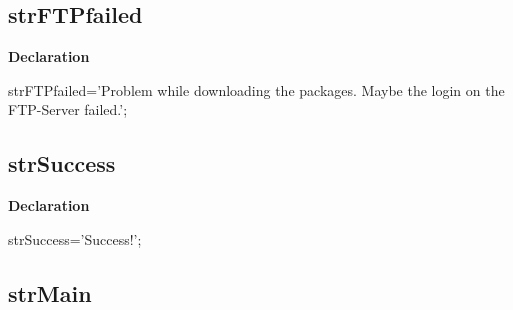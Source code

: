 \documentclass{report}
\newif\ifpdf
\begin{document}
\subsection*{strFTPfailed}
\fi
\label{trstrings-strFTPfailed}
\begin{list}{}{
\setlength{\itemindent}{0cm}
\setlength{\listparindent}{0cm}
\setlength{\leftmargin}{\evensidemargin}
\addtolength{\leftmargin}{\tmplength}
\settowidth{\labelsep}{X}
\addtolength{\leftmargin}{\labelsep}
\setlength{\labelwidth}{\tmplength}
}
\item[\textbf{Declaration}\hfill]
\ifpdf
\begin{flushleft}
\fi
\begin{ttfamily}
strFTPfailed='Problem while downloading the packages. Maybe the login on the FTP-Server failed.';\end{ttfamily}

\ifpdf
\end{flushleft}
\fi

\end{list}
\ifpdf
\subsection*{\large{\textbf{strSuccess}}\normalsize\hspace{1ex}\hrulefill}
\else
\subsection*{strSuccess}
\fi
\label{trstrings-strSuccess}
\begin{list}{}{
\setlength{\itemindent}{0cm}
\setlength{\listparindent}{0cm}
\setlength{\leftmargin}{\evensidemargin}
\addtolength{\leftmargin}{\tmplength}
\settowidth{\labelsep}{X}
\addtolength{\leftmargin}{\labelsep}
\setlength{\labelwidth}{\tmplength}
}
\item[\textbf{Declaration}\hfill]
\ifpdf
\begin{flushleft}
\fi
\begin{ttfamily}
strSuccess='Success!';\end{ttfamily}

\ifpdf
\end{flushleft}
\fi

\end{list}
\ifpdf
\subsection*{\large{\textbf{strMain}}\normalsize\hspace{1ex}\hrulefill}
\else
\end{document}
